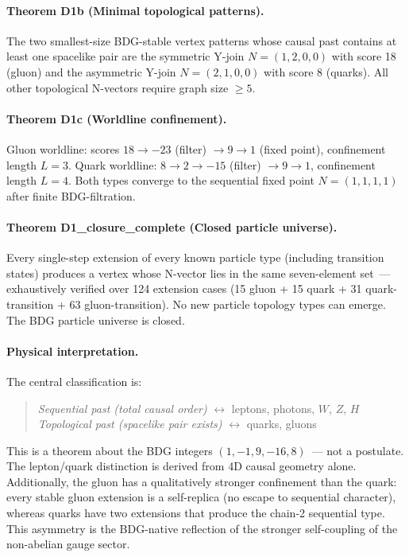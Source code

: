 \documentclass[11pt,a4paper]{article}
\begin{document}
\paragraph{Theorem D1b (Minimal topological patterns).}
The two smallest-size BDG-stable vertex patterns whose causal past contains
at least one spacelike pair are the symmetric Y-join $N=(1,2,0,0)$
with score 18 (gluon) and the asymmetric Y-join $N=(2,1,0,0)$ with
score 8 (quarks). All other topological N-vectors require graph size $\geq 5$.

\paragraph{Theorem D1c (Worldline confinement).}
Gluon worldline: scores $18 \to -23$ (filter) $\to 9 \to 1$ (fixed point),
confinement length $L=3$. Quark worldline: $8 \to 2 \to -15$ (filter)
$\to 9 \to 1$, confinement length $L=4$. Both types converge to the
sequential fixed point $N=(1,1,1,1)$ after finite BDG-filtration.

\paragraph{Theorem D1\_closure\_complete (Closed particle universe).}
Every single-step extension of every known particle type (including transition
states) produces a vertex whose N-vector lies in the same seven-element
set~--- exhaustively verified over 124 extension cases (15 gluon + 15 quark
+ 31 quark-transition + 63 gluon-transition). No new particle topology types
can emerge. The BDG particle universe is closed.

\paragraph{Physical interpretation.}
The central classification is:
\begin{quote}
\emph{Sequential past (total causal order)} $\longleftrightarrow$
leptons, photons, $W$, $Z$, $H$ \\
\emph{Topological past (spacelike pair exists)} $\longleftrightarrow$
quarks, gluons \quad [confined]
\end{quote}
This is a theorem about the BDG integers $(1,-1,9,-16,8)$~--- not a
postulate. The lepton/quark distinction is derived from 4D causal geometry
alone. Additionally, the gluon has a qualitatively stronger confinement than
the quark: every stable gluon extension is a self-replica (no escape to
sequential character), whereas quarks have two extensions that produce the
chain-2 sequential type. This asymmetry is the BDG-native reflection of
the stronger self-coupling of the non-abelian gauge sector.
\end{document}

